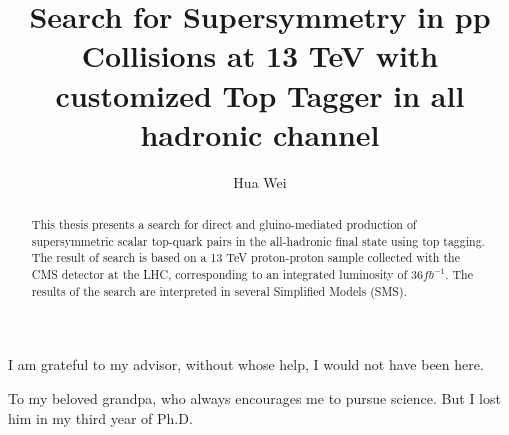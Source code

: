 \documentclass[oneside,final,letterpaper]{ucr}
\begin{document}

\title{Search for Supersymmetry in pp Collisions at 13 TeV with customized Top Tagger in all hadronic channel}
\author{Hua Wei}

\maketitle
\copyrightpage{}
\approvalpage{}

\begin{frontmatter}

\begin{acknowledgements}
I am grateful to my advisor, without whose help, I would not have been here.
\end{acknowledgements}
\begin{dedication}
\null\vfil
{\large
\begin{center}
To my beloved grandpa, who always encourages me to pursue science. But I lost him in my third year of Ph.D.
\end{center}
}
\vfil\null
\end{dedication}
\begin{abstract}
This thesis presents a search for direct and gluino-mediated production of supersymmetric scalar top-quark pairs in the all-hadronic final state using top tagging. The result of search is based on a 13 TeV proton-proton sample collected with the CMS detector at the LHC, corresponding to an integrated luminosity of $36 fb^{-1}$. The results of the search are interpreted in several Simplified Models (SMS).
\end{abstract}
\tableofcontents
\listoffigures
\listoftables
\end{frontmatter}








\nocite{*}
% 



\appendix

%
\end{document}
